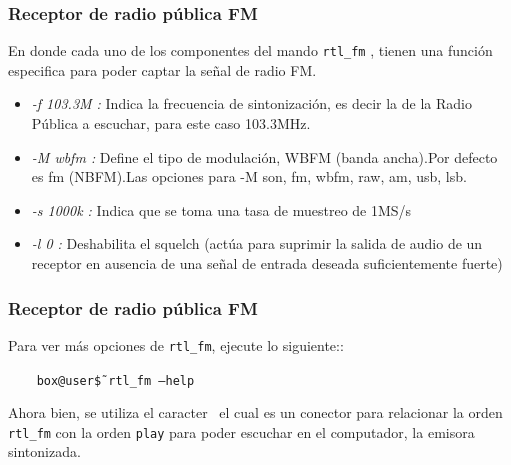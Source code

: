 \begin{frame}
\frametitle{Receptor de radio pública FM}

En donde cada uno de los componentes del mando \texttt{rtl\_fm} , tienen una función especifica para poder captar la señal de radio FM.

\begin{itemize}
    \item {\textit{-f 103.3M : } Indica la frecuencia de sintonización, es decir la de la Radio Pública a escuchar, para este caso 103.3MHz.}
    \item {\textit{-M wbfm :} Define el tipo de modulación, WBFM (banda ancha).Por defecto es fm (NBFM).Las opciones para -M son, fm, wbfm, raw, am, usb, lsb.}
    \item {\textit{-s 1000k :} Indica que se toma una tasa de muestreo de 1MS/s}
    \item {\textit{-l 0 :} Deshabilita el squelch (actúa para suprimir la salida de audio de un receptor en ausencia de una señal de entrada deseada suficientemente fuerte)}
\end{itemize}

\end{frame}

\begin{frame}
\frametitle{Receptor de radio pública FM}

Para ver más opciones de \texttt{rtl\_fm}, ejecute lo siguiente::

\begin{block}{}
  \texttt{
  \ \ \ box@user\~\$ rtl\_fm --help}
\end{block} 

Ahora bien, se utiliza el caracter \textbar  \ el cual es un conector para relacionar la orden \texttt{rtl\_fm} con la orden \texttt{play} para poder escuchar en el computador, la emisora sintonizada.


\end{frame}

